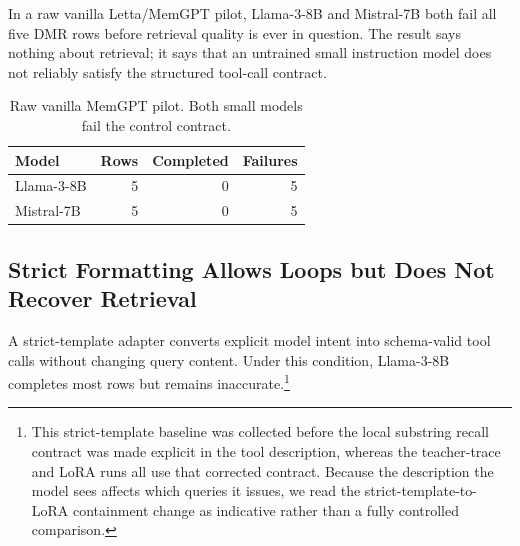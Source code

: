 \documentclass[11pt]{article}
\begin{document}
In a raw vanilla Letta/MemGPT pilot, Llama-3-8B and Mistral-7B both fail all five DMR rows before retrieval quality is ever in question. The result says nothing about retrieval; it says that an untrained small instruction model does not reliably satisfy the structured tool-call contract.

\begin{table}[t]
\centering
\small
\begin{tabular}{lrrr}
\toprule
\textbf{Model} & \textbf{Rows} & \textbf{Completed} & \textbf{Failures} \\
\midrule
Llama-3-8B & 5 & 0 & 5 \\
Mistral-7B & 5 & 0 & 5 \\
\bottomrule
\end{tabular}
\caption{Raw vanilla MemGPT pilot. Both small models fail the control contract.}
\label{tab:raw}
\end{table}

\subsection{Strict Formatting Allows Loops but Does Not Recover Retrieval}

A strict-template adapter converts explicit model intent into schema-valid tool calls without changing query content. Under this condition, Llama-3-8B completes most rows but remains inaccurate.\footnote{This strict-template baseline was collected before the local substring recall contract was made explicit in the tool description, whereas the teacher-trace and LoRA runs all use that corrected contract. Because the description the model sees affects which queries it issues, we read the strict-template-to-LoRA containment change as indicative rather than a fully controlled comparison.}

\begin{table}[t]
\centering
\small
{}
\caption{Strict formatting repairs the tool-call surface but leaves answer containment low.}
\label{tab:strict}
\end{table}
\end{document}
